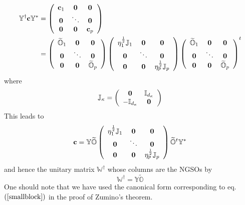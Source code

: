 \documentclass[aps,preprint]{revtex4}%
\begin{document}
\begin{align}
\mathbb{Y}^{\dagger}\mathbf{c}\mathbb{Y}^{\ast} &  =\left(
\begin{array}
[c]{ccc}%
\mathbf{c}_{1} & \mathbf{0} & \mathbf{0}\\
\mathbf{0} & \ddots & \mathbf{0}\\
\mathbf{0} & \mathbf{0} & \mathbf{c}_{p}%
\end{array}
\right)  \nonumber\\
&  =\left(
\begin{array}
[c]{ccc}%
\widetilde{\mathbb{O}}_{1} & \mathbf{0} & \mathbf{0}\\
\mathbf{0} & \ddots & \mathbf{0}\\
\mathbf{0} & \mathbf{0} & \widetilde{\mathbb{O}}_{p}%
\end{array}
\right)  \left(
\begin{array}
[c]{ccc}%
\eta_{1}^{\frac{1}{2}}\mathbb{J}_{1} & \mathbf{0} & \mathbf{0}\\
\mathbf{0} & \ddots & \mathbf{0}\\
\mathbf{0} & \mathbf{0} & \eta_{p}^{\frac{1}{2}}\mathbb{J}_{p}%
\end{array}
\right)  \left(
\begin{array}
[c]{ccc}%
\widetilde{\mathbb{O}}_{1} & \mathbf{0} & \mathbf{0}\\
\mathbf{0} & \ddots & \mathbf{0}\\
\mathbf{0} & \mathbf{0} & \widetilde{\mathbb{O}}_{p}%
\end{array}
\right)  ^{t}%
\end{align}
where
\begin{equation}
\mathbb{J}_{\kappa}=\left(
\begin{array}
[c]{cc}%
\mathbf{0} & \mathbb{I}_{d_{\kappa}}\\
-\mathbb{I}_{d_{\kappa}} & \mathbf{0}%
\end{array}
\right)
\end{equation}
This leads to
\begin{equation}
\mathbf{c}=\mathbb{Y}\widetilde{\mathbb{O}}\left(
\begin{array}
[c]{ccc}%
\eta_{1}^{\frac{1}{2}}\mathbb{J}_{1} & \mathbf{0} & \mathbf{0}\\
\mathbf{0} & \ddots & \mathbf{0}\\
\mathbf{0} & \mathbf{0} & \eta_{p}^{\frac{1}{2}}\mathbb{J}_{p}%
\end{array}
\right)  \widetilde{\mathbb{O}}^{t}\mathbb{Y}^{\ast}%
\end{equation}
and hence the unitary matrix $\mathbb{W}^{\dagger}$ whose columns are the
NGSOs by
\begin{equation}
\mathbb{W}^{\dagger}=\mathbb{Y}\widetilde{\mathbb{O}}%
\end{equation}
One should note that we have used the canonical form corresponding to eq.
$\left(  \ref{smallblock}\right)  $ in the proof of Zumino's theorem.
\end{document}
